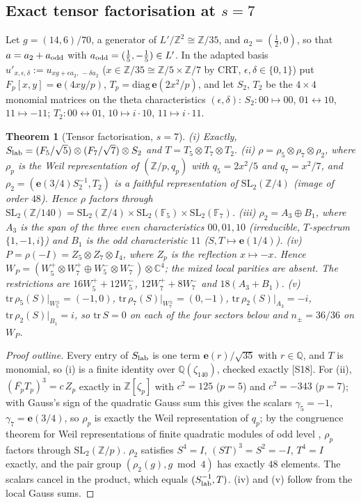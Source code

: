 \documentclass[11pt]{article}
\newtheorem{theorem}{Theorem}[section]
\theoremstyle{definition}
\theoremstyle{plain}
\newcommand{\Q}{\mathbb{Q}}
\newcommand{\Z}{\mathbb{Z}}
\newcommand{\C}{\mathbb{C}}
\newcommand{\e}{\mathbf{e}}
\newcommand{\src}[1]{\textup{[S#1]}}
\begin{document}
\subsection{Exact tensor factorisation at $s=7$}
Let $g=(14,6)/70$, a generator of $L'/\Z^2\cong\Z/35$, and $a_2=(\tfrac12,0)$, so that $a=a_2+a_{\rm odd}$ with $a_{\rm odd}=(\tfrac15,-\tfrac15)\in L'$. In the
adapted basis $u'_{x,\epsilon,\delta}:=u_{xg+\epsilon a_2,\,-\delta a_2}$ ($x\in\Z/35\cong\Z/5\times\Z/7$ by CRT, $\epsilon,\delta\in\{0,1\}$) put
$F_p[x,y]=\e(4xy/p)$, $T_p=\mathrm{diag}\,\e(2x^2/p)$, and let $S_2$, $T_2$ be the $4\times4$ monomial matrices on the theta characteristics $(\epsilon,\delta)$:
$S_2:00\mapsto00$, $01\leftrightarrow10$, $11\mapsto-11$; $T_2:00\leftrightarrow01$, $10\mapsto i\cdot10$, $11\mapsto i\cdot11$.
\begin{theorem}[Tensor factorisation, $s=7$]\label{thm:tensor7}
(i) Exactly, $S_{\rm lab}=(F_5/\sqrt5)\otimes(F_7/\sqrt7)\otimes S_2$ and $T=T_5\otimes T_7\otimes T_2$.
(ii) $\rho=\rho_5\otimes\rho_7\otimes\rho_2$, where $\rho_p$ is the Weil representation of $(\Z/p,q_p)$ with $q_5=2x^2/5$ and $q_7=x^2/7$, and
$\rho_2=(\e(3/4)S_2^{-1},T_2)$ is a faithful representation of $\mathrm{SL}_2(\Z/4)$ (image of order $48$). Hence $\rho$ factors through
$\mathrm{SL}_2(\Z/140)=\mathrm{SL}_2(\Z/4)\times\mathrm{SL}_2(\mathbb F_5)\times\mathrm{SL}_2(\mathbb F_7)$.
(iii) $\rho_2=A_3\oplus B_1$, where $A_3$ is the span of the three even characteristics $00,01,10$ (irreducible, $T$-spectrum $\{1,-1,i\}$) and $B_1$ is the odd
characteristic $11$ ($S,T\mapsto\e(1/4)$).
(iv) $P=\rho(-I)=Z_5\otimes Z_7\otimes I_4$, where $Z_p$ is the reflection $x\mapsto-x$. Hence
$W_P=(W_5^+\otimes W_7^+\oplus W_5^-\otimes W_7^-)\otimes\C^4$; the mixed local parities are absent. The restrictions are $16W_5^++12W_5^-$,
$12W_7^++8W_7^-$ and $18(A_3+B_1)$.
(v) $\mathrm{tr}\,\rho_5(S)|_{W_5^\pm}=(-1,0)$, $\mathrm{tr}\,\rho_7(S)|_{W_7^\pm}=(0,-1)$, $\mathrm{tr}\,\rho_2(S)|_{A_3}=-i$, $\mathrm{tr}\,\rho_2(S)|_{B_1}=i$, so $\mathrm{tr}\,S=0$ on each of the
four sectors below and $n_\pm=36/36$ on $W_P$.
\end{theorem}
\begin{proof}[Proof outline]
Every entry of $S_{\rm lab}$ is one term $\e(r)/\sqrt{35}$ with $r\in\Q$, and $T$ is monomial, so (i) is a finite identity over $\Q(\zeta_{140})$, checked
exactly \src{18}. For (ii), $(\overline{F_p}T_p)^3=c\,Z_p$ exactly in $\Z[\zeta_p]$ with $c^2=125$ ($p=5$) and $c^2=-343$ ($p=7$); with Gauss's sign of the quadratic
Gauss sum this gives the scalars $\gamma_5=-1$, $\gamma_7=\e(3/4)$, so $\rho_p$ is exactly the Weil representation of $q_p$; by the congruence theorem for Weil
representations of finite quadratic modules of odd level \cite{Weil}, $\rho_p$ factors through $\mathrm{SL}_2(\Z/p)$. $\rho_2$ satisfies $S^4=I$,
$(ST)^3=S^2=-I$, $T^4=I$ exactly, and the pair group $(\rho_2(g),g\bmod4)$ has exactly $48$ elements. The scalars cancel in the product, which equals
$(S_{\rm lab}^{-1},T)$. (iv) and (v) follow from the local Gauss sums.
\end{proof}
\end{document}
